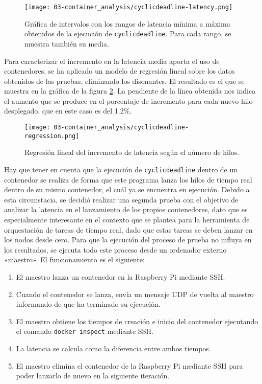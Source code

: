 \begin{figure}
    \centering
    \texttt{[image: 03-container\_analysis/cyclicdeadline-latency.png]}
    \caption{Gráfica de intervalos con los rangos de latencia mínima a máxima
        obtenidos de la ejecución de \texttt{cyclicdeadline}. Para cada rango, se
        muestra también su media.}
    \label{fig:03-cyclicdeadline_latency}
\end{figure}

Para caracterizar el incremento en la latencia media aporta el uso de
contenedores, se ha aplicado un modelo de regresión lineal sobre los datos
obtenidos de las pruebas, eliminando los disonantes. El resultado es el que se
muestra en la gráfica de la figura \ref{fig:03-cyclicdeadline_regression}. La
pendiente de la línea obtenida nos indica el aumento que se produce en el
porcentaje de incremento para cada nuevo hilo desplegado, que en este caso es
del 1.2\%.

\begin{figure}
    \centering
    \texttt{[image: 03-container\_analysis/cyclicdeadline-regression.png]}
    \caption{Regresión lineal del incremento de latencia según el número de hilos.}
    \label{fig:03-cyclicdeadline_regression}
\end{figure}

Hay que tener en cuenta que la ejecución de \texttt{cyclicdeadline} dentro de un
contenedor se realiza de forma que este programa lanza los hilos de tiempo real
dentro de su mismo contenedor, el cuál ya se encuentra en ejecución. Debido a
esta circunstacia, se decidió realizar una segunda prueba con el objetivo de
analizar la latencia en el lanzamiento de los propios contenedores, dato que es
especialmente interesante en el contexto que se plantea para la herramienta de
orquestación de tareas de tiempo real, dado que estas tareas se deben lanzar en
los nodos desde cero. Para que la ejecución del proceso de prueba no influya en
los resultados, se ejecuta todo este proceso desde un ordenador externo
«maestro». El funcionamiento es el siguiente:

\begin{enumerate}
    \item El maestro lanza un contenedor en la Raspberry Pi mediante SSH.
    \item Cuando el contenedor se lanza, envía un mensaje UDP de vuelta al
          maestro informando de que ha terminado su ejecución.
    \item El maestro obtiene los tiempos de creación e inicio del contenedor
          ejecutando el comando \texttt{docker inspect} mediante SSH.
    \item La latencia se calcula como la diferencia entre ambos tiempos.
    \item El maestro elimina el contenedor de la Raspberry Pi mediante SSH para
          poder lanzarlo de nuevo en la siguiente iteración.
\end{enumerate}

